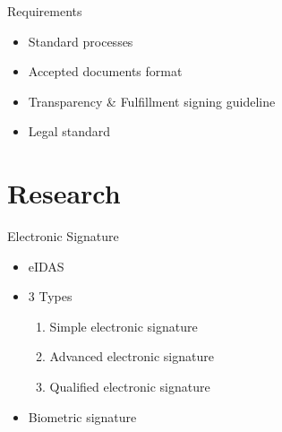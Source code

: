 \documentclass[utf8, xcolor, usenames,dvipsnames, aspectratio=169]{beamer}
\begin{document}
\begin{frame}{Requirements}
	\begin{itemize}
		\item Standard processes
		\item Accepted documents format
		\item Transparency \& Fulfillment signing guideline
		\item Legal standard
	\end{itemize}
\end{frame}

\section{Research}
\begin{frame}{Electronic Signature}
	\begin{itemize}
		\item eIDAS 
		\item 3 Types
		\begin{enumerate}
			\item Simple electronic signature
			\item Advanced electronic signature
			\item Qualified electronic signature
		\end{enumerate}
		\item Biometric signature 
	\end{itemize}
\end{frame}

\end{document}
